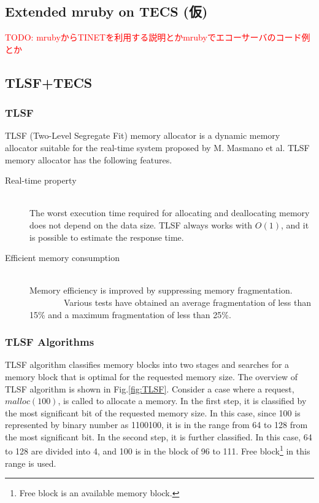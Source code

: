 \documentclass[JIP]{ipsj_v2/UTF8/ipsj}
\begin{document}
\subsection{Extended mruby on TECS (仮)}

\textcolor{red}{TODO: mrubyからTINETを利用する説明とかmrubyでエコーサーバのコード例とか}

\subsection{TLSF+TECS}
\label{sec:TLSF+TECS}

\subsubsection{TLSF}

TLSF (Two-Level Segregate Fit) memory allocator\cite{par:TLSF}\cite{url:TLSF} is a dynamic memory allocator suitable for the real-time system proposed by M. Masmano et al.
TLSF memory allocator has the following features.
\begin{description}
    \item[Real-time property]\mbox{}\\
        The worst execution time required for allocating and deallocating memory does not depend on the data size.
        TLSF always works with $O(1)$, and it is possible to estimate the response time.
    \item[Efficient memory consumption]\mbox{}\\
        Memory efficiency is improved by suppressing memory fragmentation.
        Various tests have obtained an average fragmentation of less than 15\% and a maximum fragmentation of less than 25\%.
\end{description}


\subsubsection{TLSF Algorithms}

TLSF algorithm classifies memory blocks into two stages and searches for a memory block that is optimal for the requested memory size.
The overview of TLSF algorithm is shown in Fig.\ref{fig:TLSF}.
Consider a case where a request, $malloc(100)$, is called to allocate a memory.
In the first step, it is classified by the most significant bit of the requested memory size.
In this case, since 100 is represented by binary number as 1100100, it is in the range from 64 to 128 from the most significant bit.
In the second step, it is further classified.
In this case, 64 to 128 are divided into 4, and 100 is in the block of 96 to 111.
Free block\footnote{Free block is an available memory block.} in this range is used.
\end{document}
